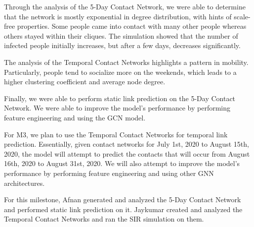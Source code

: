 \documentclass[times, 10pt,twocolumn]{article}
\begin{document}
Through the analysis of the 5-Day Contact Network, we were able to determine that the network is mostly exponential in degree distribution, with hints of scale-free properties. Some people came into contact with many other people whereas others stayed within their cliques. The simulation showed that the number of infected people initially increases, but after a few days, decreases significantly.

The analysis of the Temporal Contact Networks highlights a pattern in mobility. Particularly, people tend to socialize more on the weekends, which leads to a higher clustering coefficient and average node degree.

Finally, we were able to perform static link prediction on the 5-Day Contact Network. We were able to improve the model's performance by performing feature engineering and using the GCN model. 

For M3, we plan to use the Temporal Contact Networks for temporal link prediction. Essentially, given contact networks for July 1st, 2020 to August 15th, 2020, the model will attempt to predict the contacts that will occur from August 16th, 2020 to August 31st, 2020. We will also attempt to improve the model's performance by performing feature engineering and using other GNN architectures.

For this milestone, Afnan generated and analyzed the 5-Day Contact Network and performed static link prediction on it. Jaykumar created and analyzed the Temporal Contact Networks and ran the SIR simulation on them.





\end{document}
